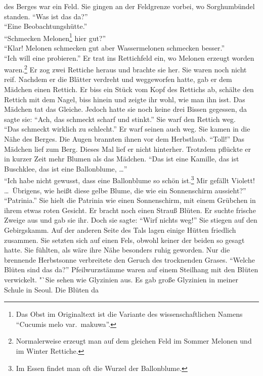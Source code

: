 \documentclass[prd,12pt,tightenlines,notitlepage,nofootinbib]{revtex4-1}
\begin{document}
des Berges war ein Feld.  Sie gingen an der Feldgrenze vorbei, wo
Sorghumbündel standen.  "`Was ist das da?"'\\
"`Eine Beobachtungshütte."'\\
"`Schmecken Melonen\footnote{
  Das Obst im Originaltext ist die Variante des wissenschaftlichen Namens
  "`Cucumis melo var.\ makuwa"'.}
hier gut?"'\\
"`Klar!  Melonen schmecken gut aber Wassermelonen schmecken besser."'\\
"`Ich will eine probieren."'  Er
trat ins Rettichfeld ein, wo Melonen erzeugt worden waren.\footnote{
Normalerweise erzeugt man auf dem gleichen Feld
im Sommer Melonen und im Winter Rettiche.}
Er zog
zwei Rettiche heraus und brachte sie her.  Sie waren noch nicht reif.
Nachdem er die Blätter verdreht und weggeworfen hatte, gab er dem Mädchen einen
Rettich.  Er biss ein Stück vom Kopf des Rettichs ab, schälte den
Rettich mit dem Nagel, biss hinein und zeigte ihr wohl, wie man ihn
isst.  Das Mädchen tat das Gleiche.  Jedoch hatte sie noch keine drei
Bissen gegessen, da sagte sie: "`Ach, das schmeckt scharf und stinkt."'  Sie warf den
Rettich weg.
\\ "`Das schmeckt wirklich zu schlecht."'  Er warf seinen auch
weg.  Sie kamen in die Nähe des Berges.  Die Augen brannten ihnen vor dem Herbstlaub.
"`Toll!"'  Das Mädchen lief zum Berg.  Dieses Mal lief er nicht hinterher.
Trotzdem pflückte er in kurzer Zeit mehr Blumen als das Mädchen.
"`Das ist eine Kamille, das ist Buschklee, das ist eine Ballonblume, \ldots"'
\\ "`Ich habe nicht gewusst, dass eine Ballonblume so schön ist.\footnote{
Im Essen findet man oft die Wurzel der Ballonblume.}
Mir gefällt
Violett!  \ldots\  Übrigens, wie heißt diese gelbe Blume, die wie ein
Sonnenschirm aussieht?"'\\
"`Patrinia."'  Sie hielt die Patrinia wie einen
Sonnenschirm, mit einem Grübchen in ihrem etwas roten Gesicht.  Er
bracht noch einen Strauß Blüten.  Er suchte frische Zweige aus und
gab sie ihr.  Doch sie sagte: "`Wirf nichts weg!"'  Sie stiegen auf den
Gebirgskamm.  Auf der anderen Seite des Tals lagen einige Hütten
friedlich zusammen.  Sie setzten sich auf einen Fels, obwohl keiner der beiden
so gesagt hatte.
Sie fühlten, als wäre ihre Nähe besonders ruhig geworden.
Nur die
brennende Herbstsonne verbreitete den Geruch des trocknenden Grases.
"`Welche Blüten sind das da?"'  Pfeilwurzstämme waren auf einem
Steilhang mit den Blüten verwickelt.  "`Sie sehen wie Glyzinien aus.
Es gab große Glyzinien in meiner Schule in Seoul.  Die Blüten da
\end{document}
